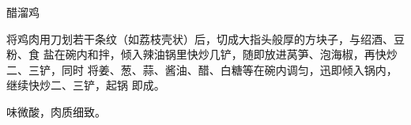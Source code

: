 \begin{recipe}{醋溜鸡}

\ingredients


\preparation

将鸡肉用刀划若干条纹（如荔枝壳状）后，切成大指头般厚的方块子，与绍酒、豆粉、食
盐在碗内和拌，倾入辣油锅里快炒几铲，随即放进莴笋、泡海椒，再快炒二、三铲，同时
将姜、葱、蒜、酱油、醋、白糖等在碗内调匀，迅即倾入锅内，继续快炒二、三铲，起锅
即成。

\features

味微酸，肉质细致。

\end{recipe}

